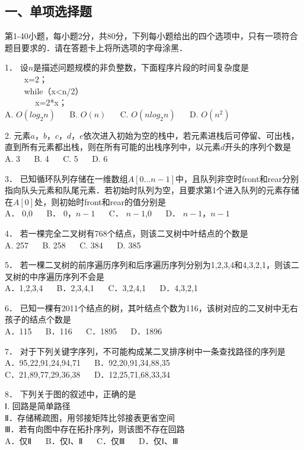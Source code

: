 
\subsection{一、单项选择题}
第1-40小题，每小题2分，共80分，下列每小题给出的四个选项中，只有一项符合题目要求的．请在答题卡上将所选项的字母涂黑．

1． 设$n$是描述问题规模的非负整数，下面程序片段的时间复杂度是  \\
$\qquad$ x=2；  \\
$\qquad$ while（x<n/2）  \\
$\quad$ $\qquad$ x=2*x；  \\
A. $O(log_2n)$ $\quad$ B. $O(n)$ $\quad$ C. $O(nlog_2n)$ $\quad$ D. $O(n^2)$

2. 元素$a$，$b$，$c$，$d$，$e$依次进入初始为空的栈中，若元素进栈后可停留、可出栈，直到所有元素都出栈，则在所有可能的出栈序列中，以元素$d$开头的序列个数是  \\
A. 3  $\quad$  B. 4  $\quad$  C. 5  $\quad$  D. 6

3． 已知循环队列存储在一维数组$A[0...n-1]$中，且队列非空时front和rear分别指向队头元素和队尾元素．若初始时队列为空，且要求第1个进入队列的元素存储在$A[0]$处，则初始时front和rear的值分别是 \\
A． $0$,$0$  $\quad$ B． $0$，$n-1$ $\quad$ C． $n-1$,$0$ $\quad$ D． $n-1$，$n-1$ 

4． 若一棵完全二叉树有768个结点，则该二叉树中叶结点的个数是 \\
A. 257 $\quad$ B. 258 $\quad$ C. 384 $\quad$ D. 385

5． 若一棵二叉树的前序遍历序列和后序遍历序列分别为1,2,3,4和4,3,2,1，则该二叉树的中序遍历序列不会是 \\
A．1,2,3,4 $\quad$ B．2,3,4,1 $\quad$ C．3,2,4,1 $\quad$ D．4,3,2,1

6． 已知一棵有2011个结点的树，其叶结点个数为116，该树对应的二叉树中无右孩子的结点个数是 \\
A．115 $\quad$ B．116 $\quad$ C．1895 $\quad$ D．1896

7． 对于下列关键字序列，不可能构成某二叉排序树中一条查找路径的序列是 \\
A．95,22,91,24,94,71 $\quad$ B．92,20,91,34,88,35 \\
C．21,89,77,29,36,38 $\quad$ D．12,25,71,68,33,34

8． 下列关于图的叙述中，正确的是 \\
Ⅰ. 回路是简单路径 \\
Ⅱ．存储稀疏图，用邻接矩阵比邻接表更省空间 \\
Ⅲ．若有向图中存在拓扑序列，则该图不存在回路 \\
A．仅Ⅱ $\quad$ B．仅Ⅰ、Ⅱ $\quad$  C．仅Ⅲ $\quad$ D．仅Ⅰ、Ⅲ

